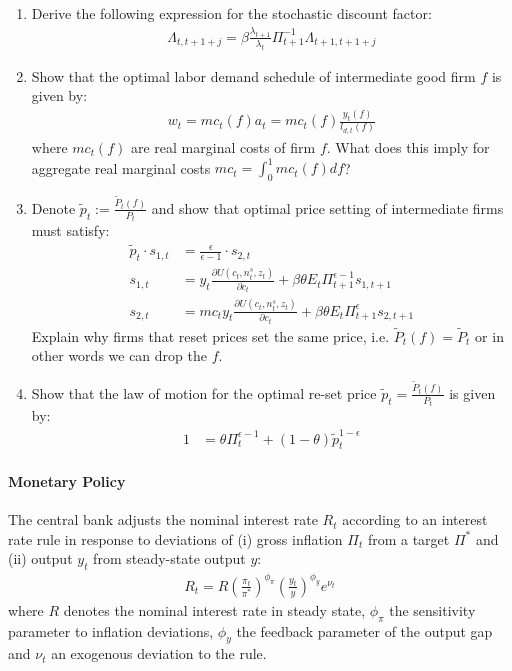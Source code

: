 \begin{enumerate}[resume]
\item Derive the following expression for the stochastic discount factor:
\begin{align*}
\Lambda_{t,t+1+j} = \beta \frac{\lambda_{t+1}}{\lambda_t} \Pi_{t+1}^{-1} \Lambda_{t+1,t+1+j}
\end{align*}

\item Show that the optimal labor demand schedule of intermediate good firm \(f\) is given by:
\begin{align*}
w_t = mc_t(f) a_t = mc_t(f) \frac{y_t(f)}{l_{d,t}(f)}
\end{align*}
where \(mc_t(f)\) are real marginal costs of firm \(f\).
What does this imply for aggregate real marginal costs \(mc_t=\int_0^1 mc_t(f)df\)?

\item Denote \(\widetilde{p}_t := \frac{\widetilde{P}_t(f)}{P_t}\) and show that optimal price setting of intermediate firms must satisfy:
\begin{align*}
\widetilde{p}_t \cdot s_{1,t} &= \frac{\epsilon}{\epsilon-1} \cdot s_{2,t} \\
s_{1,t}&=y_t \frac{\partial U(c_t,n^s_t,z_t)}{\partial c_t} + \beta \theta E_t \Pi_{t+1}^{\epsilon-1}s_{1,t+1} \\
s_{2,t}&= mc_t y_{t} \frac{\partial U(c_t,n^s_t,z_t)}{\partial c_t} + \beta \theta E_t \Pi_{t+1}^{\epsilon} s_{2,t+1}
\end{align*}
Explain why firms that reset prices set the same price, i.e.
\(\widetilde{P}_t(f) =\widetilde{P}_t\) or in other words we can drop the \(f\).

\item Show that the law of motion for the optimal re-set price \(\widetilde{p}_t = \frac{\widetilde{P}_t(f)}{P_t}\) is given by:
\begin{align*}
1&=\theta \Pi_{t}^{\epsilon-1}+\left(1-\theta\right) \widetilde{p}_t^{1-\epsilon}
\end{align*}

\end{enumerate}

\paragraph{Monetary Policy}
The central bank adjusts the nominal interest rate \(R_t\) according to an interest rate rule in response to deviations of (i) gross inflation \(\Pi_t\) from a target \(\Pi^*\) and (ii) output \(y_t\) from steady-state output \(y\):
\begin{align}
    R_t = R {\left(\frac{\pi_t}{\pi^*}\right)}^{\phi_\pi} {\left(\frac{y_t}{y}\right)}^{\phi_y} e^{\nu_t} \label{eq:NewKeynesianMonetaryPolicyRule}
\end{align}
where \(R\) denotes the nominal interest rate in steady state, \(\phi_\pi \) the sensitivity parameter to inflation deviations, \(\phi_y\) the feedback parameter of the output gap and \(\nu_t\) an exogenous deviation to the rule.


